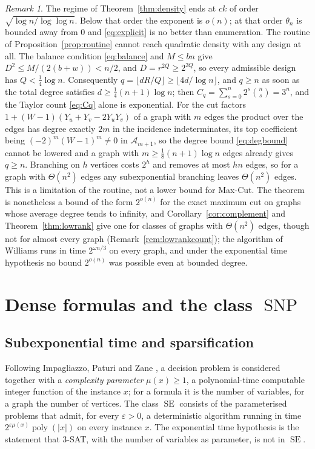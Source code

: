 \documentclass[11pt,reqno]{amsart}
\numberwithin{equation}{section}
\theoremstyle{plain}
\theoremstyle{definition}
\theoremstyle{remark}
\newtheorem{remark}[theorem]{Remark}
\DeclareMathOperator{\poly}{poly}
\DeclareMathOperator{\SE}{SE}
\DeclareMathOperator{\SNP}{SNP}
\newcommand{\A}{\mathcal{A}}
\begin{document}
\begin{remark}\label{rem:densityend}
The regime of Theorem~\ref{thm:density} ends at $ck$ of order
$\sqrt{\log n/\log\log n}$. Below that order the exponent is $o(n)$; at that order
$\theta_n$ is bounded away from $0$ and \eqref{eq:explicit} is no better than
enumeration. The routine of Proposition~\ref{prop:routine} cannot reach quadratic
density with any design at all. The balance condition \eqref{eq:balance} and
$M\le bn$ give $D^2\le M/(2(b+w))<n/2$, and $D=r^{2Q}\ge2^{2Q}$, so every admissible
design has $Q<\frac14\log n$. Consequently $q=\lfloor dR/Q\rfloor\ge\lfloor4d/\log n\rfloor$,
and $q\ge n$ as soon as the total degree satisfies $d\ge\frac14(n+1)\log n$; then
$C_q=\sum_{s=0}^n2^s\binom ns=3^n$, and the Taylor count \eqref{eq:Cq} alone is
exponential. For the cut factors $1+(W-1)(Y_u+Y_v-2Y_uY_v)$ of a graph with $m$ edges
the product over the edges has degree exactly $2m$ in the incidence indeterminates,
its top coefficient being $(-2)^m(W-1)^m\ne0$ in $\A_{m+1}$, so the degree bound
\eqref{eq:degbound} cannot be lowered and a graph with $m\ge\frac18(n+1)\log n$
edges already gives $q\ge n$. Branching on $h$ vertices costs $2^h$ and removes at
most $hn$ edges, so for a graph with $\Theta(n^2)$ edges any subexponential branching
leaves $\Theta(n^2)$ edges. This is a limitation of the routine, not a lower bound for
Max-Cut. The theorem is nonetheless a bound of the form $2^{o(n)}$ for the exact
maximum cut on graphs whose average degree tends to infinity, and
Corollary~\ref{cor:complement} and Theorem~\ref{thm:lowrank} give one for classes of
graphs with $\Theta(n^2)$ edges, though not for almost every graph
(Remark~\ref{rem:lowrankcount}); the algorithm of Williams \cite{Wil05} runs in time $2^{\omega n/3}$ on every
graph, and under the exponential time hypothesis no bound $2^{o(n)}$ was possible
even at bounded degree.
\end{remark}

\section{Dense formulas and the class \texorpdfstring{$\SNP$}{SNP}}\label{sec:snp}

\subsection{Subexponential time and sparsification}
Following Impagliazzo, Paturi and Zane \cite{IPZ01}, a decision problem is
considered together with a \emph{complexity parameter} $\mu(x)\ge1$, a
polynomial-time computable integer function of the instance $x$; for a
formula it is the number of variables, for a graph the number of vertices. The
class $\SE$ consists of the parameterised problems that admit, for every
$\varepsilon>0$, a deterministic algorithm running in time
$2^{\varepsilon\mu(x)}\poly(|x|)$ on every instance $x$. The exponential time
hypothesis is the statement that $3$-SAT, with the number of variables as
parameter, is not in $\SE$.
\end{document}
